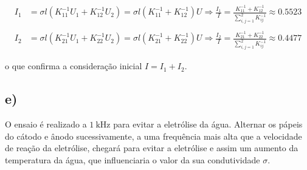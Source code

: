 \documentclass[portuguese, a4paper]{article}
\begin{document}
		\begin{align*}
				I_1 &= \sigma l \left(K^{-1}_{11}U_1 + K^{-1}_{12}U_2\right) = \sigma l \left(K^{-1}_{11} + K^{-1}_{12} \right)	U \Rightarrow \frac{I_1}{I} = \frac{K^{-1}_{11} + K^{-1}_{12}} {\sum\limits_{i,j=1}^{2} K^{-1}_{ij}}
				\approx 0.5523 \\ \\
				I_2 &= \sigma l \left(K^{-1}_{21}U_1 + K^{-1}_{22}U_2\right) = \sigma l \left(K^{-1}_{21} + K^{-1}_{22} \right)	U \Rightarrow \frac{I_2}{I} = \frac{K^{-1}_{21} + K^{-1}_{22}} {\sum\limits_{i,j=1}^{2} K^{-1}_{ij}}
				\approx 0.4477
		\end{align*}

		\par
		o que confirma a consideração inicial $I = I_1 + I_2$.

	\subsection{e)}
		\par
		O ensaio é realizado a $\SI{1}{\kilo\hertz}$ para evitar a eletrólise da água. Alternar os pápeis do cátodo e ânodo sucessivamente, a uma frequência mais alta que a velocidade de reação da eletrólise, chegará para evitar a eletrólise e assim um aumento da temperatura da água, que influenciaria o valor da sua condutividade $\sigma$.
\end{document}
